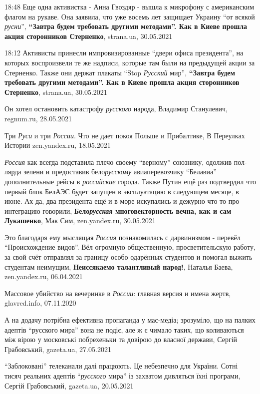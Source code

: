 18:48  Еще одна активистка - Анна Гвоздяр - вышла к микрофону с американским
флагом на рукаве. Она заявила, что уже восемь лет защищает Украину \enquote{от
всякой \emph{русни}}, \textbf{\enquote{Завтра будем требовать другими
методами}. Как в Киеве прошла акция сторонников Стерненко}, strana.ua,
30.05.2021

18:12  Активисты принесли импровизированные \enquote{двери офиса президента},
на которых воспроизвели те же надписи, которые там были на предыдущей акции за
Стерненко. Также они держат плакаты \enquote{Stop \emph{Русский} мир},
\textbf{\enquote{Завтра будем требовать другими методами}. Как в Киеве прошла
акция сторонников Стерненко}, strana.ua, 30.05.2021

Он хотел остановить катастрофу \emph{русского} народа, Владимир Станулевич, regnum.ru, 28.05.2021

Три \emph{Руси} и три \emph{России}. Что не дает покоя Польше и Прибалтике, В
Переулках Истории zen.yandex.ru, 18.05.2021

\emph{Россия} как всегда подставила плечо своему \enquote{верному} союзнику,
одолжив пол-лярда зелени и предоставив бело\emph{русскому} авиаперевозчику
\enquote{Белавиа} дополнительные рейсы в \emph{российские} города.  Также Путин
ещё раз подтвердил что первый блок БелАЭС будет запущен в эксплуатацию в
следующем месяце, в июне. Ах да, два президента ещё и в море искупались и
дежурно что-то про интеграцию говорили, \textbf{Бело\emph{русская}
многовекторность вечна, как и сам Лукашенко}, Мак Сим, zen.yandex.ru,
30.05.2021

Это благодаря ему мыслящая \emph{Россия} познакомилась с дарвинизмом - перевёл
\enquote{Происхождение видов}. Вёл огромную общественную, просветительскую
работу, за свой счёт отправлял за границу особо одарённых студентов и помогал
выжить студентам неимущим, \textbf{Неиссякаемо талантливый народ!}, Наталья
Баева, zen.yandex.ru, 06.04.2021

Массовое убийство на вечеринке в \emph{России}: главная версия и имена жертв,
glavred.info, 07.11.2020

А на додачу потрібна ефективна пропаганда у мас-медіа; зрозуміло, що на палких
адептів \enquote{русского мира} вона не подіє, але ж є чимало таких, що
коливаються між вірою у московські побрехеньки та довірою до власної держави,
Сергій Грабовський, gazeta.ua, 27.05.2021

\enquote{Заблоковані} телеканали далі працюють. Це небезпечно для України.
Сотні тисяч реальних адептів \enquote{\emph{русского} мира} із захватом
дивляться їхні програми, Сергій Грабовський, gazeta.ua, 20.05.2021

